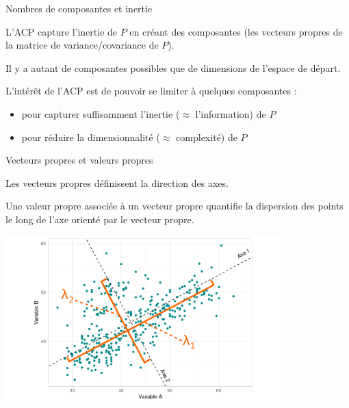 \documentclass{beamer}
\begin{document}
\begin{frame}{Nombres de composantes et inertie}

L'ACP capture l'inertie de $P$ en créant des \alert{composantes} (les vecteurs propres de  la matrice de variance/covariance de $P$). 

\medskip

Il y a autant de composantes possibles que de dimensions de l'espace de départ. 

\medskip  


L'intérêt de l'ACP est de pouvoir se limiter à \alert{quelques} composantes :  
\begin{itemize}
\item  pour capturer suffisamment l'inertie ($\approx$ l'information) de $P$
\item  pour réduire la dimensionnalité ($\approx$ complexité) de $P$
\end{itemize}

\end{frame}


\begin{frame}{Vecteurs propres et valeurs propres }

Les \alert{vecteurs propres} définissent la \alert{direction} des axes.

Une \alert{valeur propre}  associée à un vecteur propre  quantifie la \alert{dispersion} des points le long de l'axe orienté par le vecteur propre.

\centering
\includegraphics[width=0.8\textwidth,keepaspectratio]{img/exemple_2D_axe_eigen.png}



\end{frame}
\end{document}
